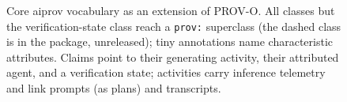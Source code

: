 \begin{figure}[t]
{%
}
\caption{Core aiprov vocabulary as an extension of PROV-O. All classes but
the verification-state class reach a \texttt{prov:} superclass (the
dashed class is in the package, unreleased); tiny annotations name characteristic
attributes. Claims point to their generating activity, their
attributed agent, and a verification state; activities carry inference
telemetry and link prompts (as plans) and transcripts.}
\label{fig:vocab}
\end{figure}

